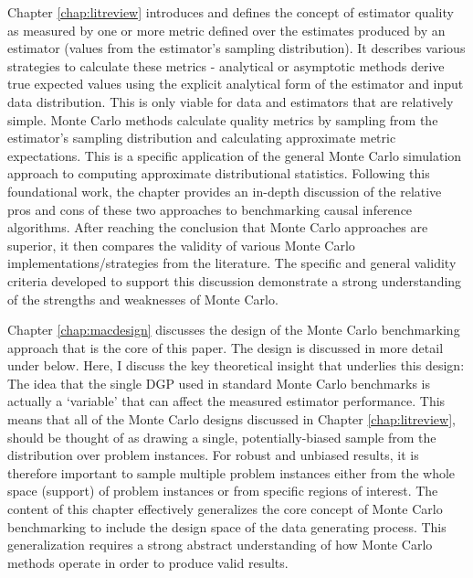 \documentclass[../main.tex]{subfiles}
\begin{document}
Chapter \ref{chap:litreview} introduces and defines the concept of estimator quality as measured by one or more metric defined over the estimates produced by an estimator (values from the estimator's sampling distribution). It describes various strategies to calculate these metrics - analytical or asymptotic methods derive true expected values using the explicit analytical form of the estimator and input data distribution. This is only viable for data and estimators that are relatively simple. Monte Carlo methods calculate quality metrics by sampling from the estimator's sampling distribution and calculating approximate metric expectations. This is a specific application of the general Monte Carlo simulation approach to computing approximate distributional statistics. Following this foundational work, the chapter provides an in-depth discussion of the relative pros and cons of these two approaches to benchmarking causal inference algorithms. After reaching the conclusion that Monte Carlo approaches are superior, it then compares the validity of various Monte Carlo implementations/strategies from the literature. The specific and general validity criteria developed to support this discussion demonstrate a strong understanding of the strengths and weaknesses of Monte Carlo.

\vspace{\baselineskip}

Chapter \ref{chap:macdesign} discusses the design of the Monte Carlo benchmarking approach that is the core of this paper. The design is discussed in more detail under  below. Here, I discuss the key theoretical insight that underlies this design: The idea that the single DGP used in standard Monte Carlo benchmarks is actually a `variable' that can affect the measured estimator performance. This means that all of the Monte Carlo designs discussed in Chapter \ref{chap:litreview}, should be thought of as drawing a single, potentially-biased sample from the distribution over problem instances. For robust and unbiased results, it is therefore important to sample multiple problem instances either from the whole space (support) of problem instances or from specific regions of interest. The content of this chapter effectively generalizes the core concept of Monte Carlo benchmarking to include the design space of the data generating process. This generalization requires a strong abstract understanding of how Monte Carlo methods operate in order to produce valid results.

\end{document}
